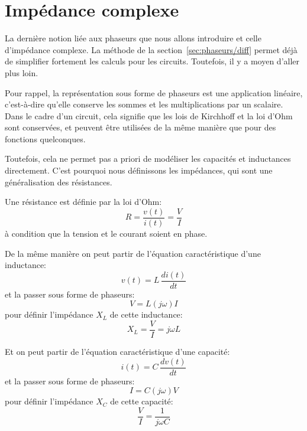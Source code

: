 \section{Impédance complexe}

La dernière notion liée aux phaseurs que nous allons introduire
et celle d'impédance complexe.
La méthode de la section~\ref{sec:phaseurs/diff} permet déjà
de simplifier fortement les calculs pour les circuits.
Toutefois, il y a moyen d'aller plus loin.

Pour rappel, la représentation sous forme de phaseurs est une application
linéaire,
c'est-à-dire qu'elle conserve les sommes et les multiplications par un scalaire.
Dans le cadre d'un circuit, cela signifie
que les lois de Kirchhoff et la loi d'Ohm sont conservées,
et peuvent être utilisées de la même manière que pour des fonctions
quelconques.

Toutefois, cela ne permet pas a priori de modéliser les capacités
et inductances directement.
C'est pourquoi nous définissons les impédances, qui sont une généralisation
des résistances.

Une résistance est définie par la loi d'Ohm:
\begin{equation}
    R = \frac{v(t)}{i(t)} = \frac{V}{I}
\end{equation}
à condition que la tension et le courant soient en phase.

De la même manière on peut partir de l'équation caractéristique
d'une inductance:
\begin{equation}
    v(t) = L\,\frac{di(t)}{dt}
\end{equation}
et la passer sous forme de phaseurs:
\begin{equation}
    V = L (j\omega) I
\end{equation}
pour définir l'impédance $X_L$ de cette inductance:
\begin{equation}
    X_L = \frac{V}{I} = j\omega L
\end{equation}

Et on peut partir de l'équation caractéristique d'une capacité:
\begin{equation}
    i(t) = C\,\frac{dv(t)}{dt}
\end{equation}
et la passer sous forme de phaseurs:
\begin{equation}
    I = C (j\omega) V
\end{equation}
pour définir l'impédance $X_C$ de cette capacité:
\begin{equation}
    \frac{V}{I} = \frac{1}{j\omega C}
\end{equation}

